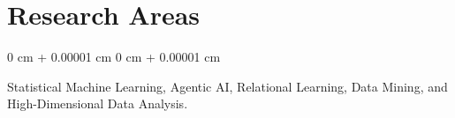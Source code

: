 \documentclass[10pt, letterpaper]{article}
\newenvironment{highlightsforbulletentries}{
    \begin{itemize}[
        topsep=0.10 cm,
        parsep=0.10 cm,
        partopsep=0pt,
        itemsep=0pt,
        leftmargin=10pt
    ]
}{
    \end{itemize}
} %
\newenvironment{onecolentry}{
    \begin{adjustwidth}{
        0 cm + 0.00001 cm
    }{
        0 cm + 0.00001 cm
    }
}{
    \end{adjustwidth}
} %
\begin{document}
    









    \section{Research Areas}
        \begin{onecolentry}
    Statistical Machine Learning, Agentic AI, Relational Learning, Data Mining, and High-Dimensional Data Analysis.
    \end{onecolentry}

        \vspace{0.2 cm}

\end{document}
